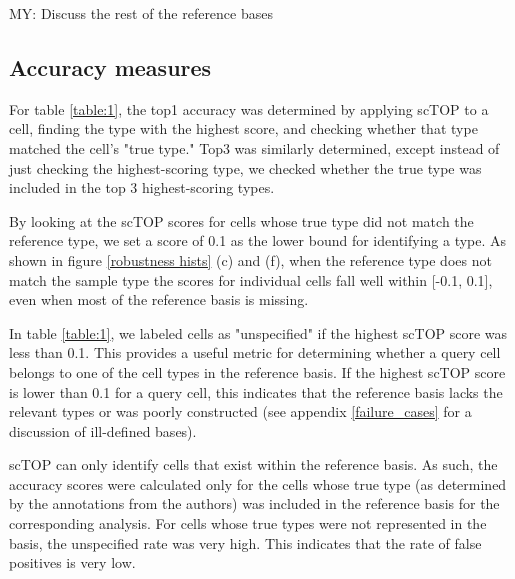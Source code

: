 \documentclass[aps,superscriptaddress, notitlepage,longbibliography]{revtex4-1}
\begin{document}
{\color{red} MY: Discuss the rest of the reference bases} 

\subsection{Accuracy measures}
For table \ref{table:1}, the top1 accuracy was determined by applying scTOP to a cell, finding the type with the highest score, and checking whether that type matched the cell's "true type." Top3 was similarly determined, except instead of just checking the highest-scoring type, we checked whether the true type was included in the top 3 highest-scoring types.

By looking at the scTOP scores for cells whose true type did not match the reference type, we set a score of 0.1 as the lower bound for identifying a type. As shown in figure \ref{robustness hists} (c) and (f), when the reference type does not match the sample type the scores for individual cells fall well within [-0.1, 0.1], even when most of the reference basis is missing.

In table \ref{table:1}, we labeled cells as "unspecified" if the highest scTOP score was less than 0.1. This provides a useful metric for determining whether a query cell belongs to one of the cell types in the reference basis. If the highest scTOP score is lower than 0.1 for a query cell, this indicates that the reference basis lacks the relevant types or was poorly constructed (see appendix \ref{failure_cases} for a discussion of ill-defined bases). 

scTOP can only identify cells that exist within the reference basis. As such, the accuracy scores were calculated only for the cells whose true type (as determined by the annotations from the authors) was included in the reference basis for the corresponding analysis. For cells whose true types were not represented in the basis, the unspecified rate was very high. This indicates that the rate of false positives is very low.
\end{document}
